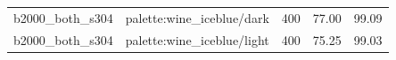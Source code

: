 \begin{longtable}{l>{\raggedright\arraybackslash}p{.42\linewidth}rrr}
b2000\_\allowbreak{}both\_\allowbreak{}s304 & %
palette:wine\_\allowbreak{}iceblue/dark & %
400 & %
77.00 & %
99.09 \\ %

b2000\_\allowbreak{}both\_\allowbreak{}s304 & %
palette:wine\_\allowbreak{}iceblue/light & %
400 & %
75.25 & %
99.03 \\ %


\end{longtable}
